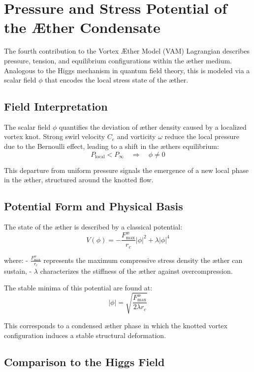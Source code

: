 \section{Pressure and Stress Potential of the Æther Condensate}

The fourth contribution to the Vortex Æther Model (VAM) Lagrangian describes pressure, tension, and equilibrium configurations within the æther medium. Analogous to the Higgs mechanism in quantum field theory, this is modeled via a scalar field $\phi$ that encodes the local stress state of the æther.

\subsection*{Field Interpretation}

The scalar field $\phi$ quantifies the deviation of æther density caused by a localized vortex knot. Strong swirl velocity $C_e$ and vorticity $\omega$ reduce the local pressure due to the Bernoulli effect, leading to a shift in the æther\rqs s equilibrium:
\[
    P_\text{local} < P_\infty \quad \Rightarrow \quad \phi \neq 0
\]

This departure from uniform pressure signals the emergence of a new local phase in the æther, structured around the knotted flow.

\subsection*{Potential Form and Physical Basis}

The state of the æther is described by a classical potential:
\[
    V(\phi) = -\frac{F^{\text{\ae}}_{\text{max}}}{r_c} |\phi|^2 + \lambda |\phi|^4
\]

where:
- $\frac{F^{\text{\ae}}_{\text{max}}}{r_c}$ represents the maximum compressive stress density the æther can sustain,
- $\lambda$ characterizes the stiffness of the æther against overcompression.

The stable minima of this potential are found at:
\[
    |\phi| = \sqrt{\frac{F^{\text{\ae}}_{\text{max}}}{2\lambda r_c}}
\]

This corresponds to a condensed æther phase in which the knotted vortex configuration induces a stable structural deformation.

\subsection*{Comparison to the Higgs Field}

